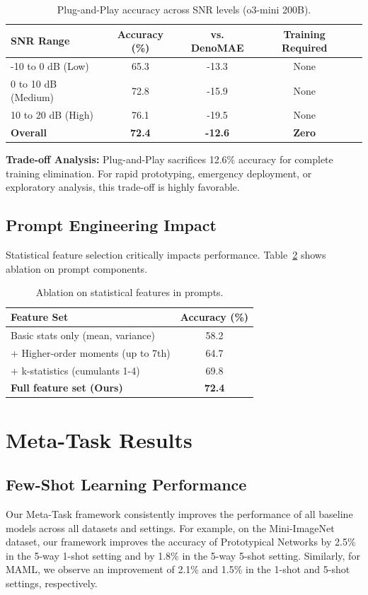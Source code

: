 \begin{table}[ht]
\centering
\caption{Plug-and-Play accuracy across SNR levels (o3-mini 200B).}
\label{tab:pnp_snr}
\begin{tabular}{lcccc}
\toprule
\textbf{SNR Range} & \textbf{Accuracy (\%)} & \textbf{vs. DenoMAE} & \textbf{Training Required} \\
\midrule
-10 to 0 dB (Low) & 65.3 & -13.3 & None \\
0 to 10 dB (Medium) & 72.8 & -15.9 & None \\
10 to 20 dB (High) & 76.1 & -19.5 & None \\
\midrule
\textbf{Overall} & \textbf{72.4} & \textbf{-12.6} & \textbf{Zero} \\
\bottomrule
\end{tabular}
\end{table}

\textbf{Trade-off Analysis:} Plug-and-Play sacrifices 12.6\% accuracy for complete training elimination. For rapid prototyping, emergency deployment, or exploratory analysis, this trade-off is highly favorable.

\subsection{Prompt Engineering Impact}
Statistical feature selection critically impacts performance. Table~\ref{tab:pnp_features} shows ablation on prompt components.

\begin{table}[ht]
\centering
\caption{Ablation on statistical features in prompts.}
\label{tab:pnp_features}
\begin{tabular}{lc}
\toprule
\textbf{Feature Set} & \textbf{Accuracy (\%)} \\
\midrule
Basic stats only (mean, variance) & 58.2 \\
+ Higher-order moments (up to 7th) & 64.7 \\
+ k-statistics (cumulants 1-4) & 69.8 \\
\textbf{Full feature set (Ours)} & \textbf{72.4} \\
\bottomrule
\end{tabular}
\end{table}

\section{Meta-Task Results}
\label{res:metatask}
\subsection{Few-Shot Learning Performance}
Our Meta-Task framework consistently improves the performance of all baseline models across all datasets and settings. For example, on the Mini-ImageNet dataset, our framework improves the accuracy of Prototypical Networks by 2.5\% in the 5-way 1-shot setting and by 1.8\% in the 5-way 5-shot setting. Similarly, for MAML, we observe an improvement of 2.1\% and 1.5\% in the 1-shot and 5-shot settings, respectively.

